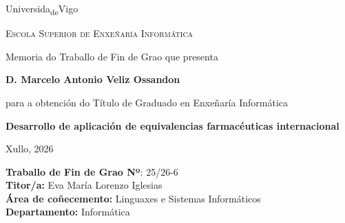 \documentclass[12pt, a4paper]{report}
\begin{document}

\begin{titlepage}
    \centering
    \vspace*{1.5cm}

    {\fontsize{40}{48}\selectfont Universida\textsubscript{de}Vigo}

    \vspace{1cm}
    {\large\textsc{Escola Superior de Enxeñaría Informática}}

    \vspace{3cm}
    Memoria do Traballo de Fin de Grao que presenta

    \vspace{0.5cm}
    {\Large\textbf{D. Marcelo Antonio Veliz Ossandon}}

    \vspace{0.5cm}
    para a obtención do Título de Graduado en Enxeñaría Informática

    \vspace{1.5cm}
    {\large\textbf{Desarrollo de aplicación de equivalencias farmacéuticas internacional}}

    \vfill

    \begin{flushleft}
        Xullo, 2026

        \vspace{0.4cm}
        \textbf{Traballo de Fin de Grao Nº}: 25/26-6 \\
        \textbf{Titor/a:} Eva María Lorenzo Iglesias \\
        \textbf{Área de coñecemento:} Linguaxes e Sistemas Informáticos \\
        \textbf{Departamento:} Informática
    \end{flushleft}
\end{titlepage}

\setcounter{page}{1}
\thispagestyle{empty}

\renewcommand{\contentsname}{Índice de Contenidos}
\tableofcontents
\newpage

\renewcommand{\listfigurename}{Índice de Ilustraciones}
\listoffigures
\newpage

\renewcommand{\listtablename}{Índice de Tablas}
\listoftables
\newpage
\end{document}
